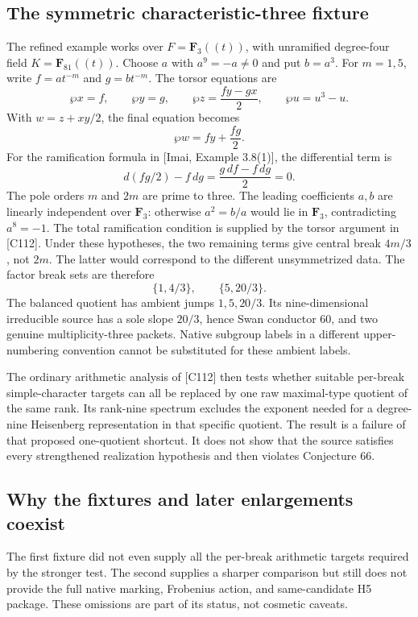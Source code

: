 \documentclass[11pt]{article}
\theoremstyle{definition}\newtheorem{definition}[proposition]{Definition}
\newcommand{\F}{\mathbf F}
\begin{document}
\subsection{The symmetric characteristic-three fixture}
The refined example works over $F=\F_3((t))$, with unramified degree-four field $K=\F_{81}((t))$. Choose $a$ with $a^9=-a\neq0$ and put $b=a^3$. For $m=1,5$, write $f=a t^{-m}$ and $g=b t^{-m}$. The torsor equations are
\[
 \wp x=f,\qquad \wp y=g,\qquad
 \wp z=\frac{fy-gx}{2},\qquad \wp u=u^3-u.
 \tag{16.2}\label{eq:symmetric}
\]
With $w=z+xy/2$, the final equation becomes
\[
 \wp w=fy+\frac{fg}{2}.
\]
For the ramification formula in [Imai, Example 3.8(1)], the differential term is
\[
 d(fg/2)-f\,dg=\frac{g\,df-f\,dg}{2}=0.
\]
The pole orders $m$ and $2m$ are prime to three. The leading coefficients $a,b$ are linearly independent over $\F_3$: otherwise $a^2=b/a$ would lie in $\F_3$, contradicting $a^8=-1$. The total ramification condition is supplied by the torsor argument in [C112]. Under these hypotheses, the two remaining terms give central break $4m/3$, not $2m$. The latter would correspond to the different unsymmetrized data. The factor break sets are therefore
\[
 \{1,4/3\},\qquad\{5,20/3\}.
\]
The balanced quotient has ambient jumps $1,5,20/3$. Its nine-dimensional irreducible source has a sole slope $20/3$, hence Swan conductor 60, and two genuine multiplicity-three packets. Native subgroup labels in a different upper-numbering convention cannot be substituted for these ambient labels.

The ordinary arithmetic analysis of [C112] then tests whether suitable per-break simple-character targets can all be replaced by one raw maximal-type quotient of the same rank. Its rank-nine spectrum excludes the exponent needed for a degree-nine Heisenberg representation in that specific quotient. The result is a failure of that proposed one-quotient shortcut. It does not show that the source satisfies every strengthened realization hypothesis and then violates Conjecture 66.

\subsection{Why the fixtures and later enlargements coexist}
The first fixture did not even supply all the per-break arithmetic targets required by the stronger test. The second supplies a sharper comparison but still does not provide the full native marking, Frobenius action, and same-candidate H5 package. These omissions are part of its status, not cosmetic caveats.
\end{document}
